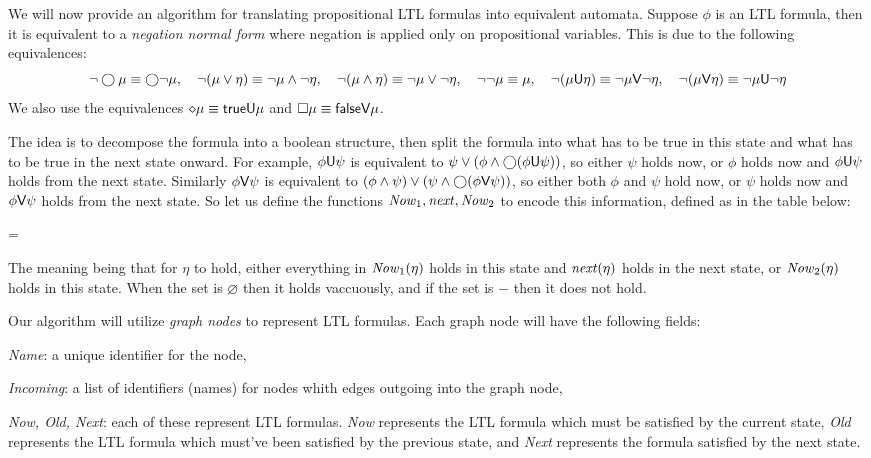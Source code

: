 We will now provide an algorithm for translating propositional LTL formulas into equivalent automata.
Suppose $\phi$ is an LTL formula, then it is equivalent to a {\it negation normal form} where negation is applied only on propositional variables.
This is due to the following equivalences:
$$ \neg\bigcirc\mu \equiv \bigcirc\neg\mu,\quad\neg(\mu\lor\eta)\equiv\neg\mu\land\neg\eta,\quad\neg(\mu\land\eta)\equiv\neg\mu\lor\neg\eta,\quad\neg\neg\mu\equiv\mu,\quad
\neg(\mu{\sf U}\eta)\equiv\neg\mu{\sf V}\neg\eta,\quad\neg(\mu{\sf V}\eta)\equiv\neg\mu{\sf U}\neg\eta $$
We also use the equivalences $\diamond\mu\equiv{\sf true}{\sf U}\mu$ and $\square\mu\equiv{\sf false}{\sf V}\mu$.

The idea is to decompose the formula into a boolean structure, then split the formula into what has to be true in this state and what has to be true in the next state onward.
For example, $\phi{\sf U}\psi$ is equivalent to $\psi\lor(\phi\land\bigcirc(\phi{\sf U}\psi))$, so either $\psi$ holds now, or $\phi$ holds now and $\phi{\sf U}\psi$ holds from the next state.
Similarly $\phi{\sf V}\psi$ is equivalent to $(\phi\land\psi)\lor(\psi\land\bigcirc(\phi{\sf V}\psi))$, so either both $\phi$ and $\psi$ hold now, or $\psi$ holds now and $\phi{\sf V}\psi$ holds from the next state.
So let us define the functions ${\it Now}_1,{\it next},{\it Now}_2$ to encode this information, defined as in the table below:

\centerline{
    \vbox{\everycr={\noalign{\hrule}}}}

The meaning being that for $\eta$ to hold, either everything in ${\it Now}_1(\eta)$ holds in this state and ${\it next}(\eta)$ holds in the next state, or ${\it Now}_2(\eta)$ holds in this state.
When the set is $\varnothing$ then it holds vaccuously, and if the set is $-$ then it does not hold.

Our algorithm will utilize {\it graph nodes} to represent LTL formulas.
Each graph node will have the following fields:
\benum
    \item {\it Name}: a unique identifier for the node,
    \item {\it Incoming}: a list of identifiers (names) for nodes whith edges outgoing into the graph node,
    \item {\it Now, Old, Next}: each of these represent LTL formulas.
        {\it Now} represents the LTL formula which must be satisfied by the current state, {\it Old} represents the LTL formula which must've been satisfied by the previous state, and {\it Next} represents
        the formula satisfied by the next state.
\eenum

